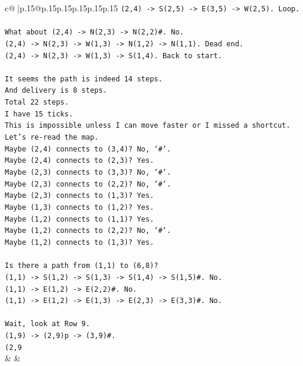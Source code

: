 \documentclass{article}
\begin{document}
{\begin{supertabular}{c@{$\;$}|p{.15\linewidth}@{}p{.15\linewidth}p{.15\linewidth}p{.15\linewidth}p{.15\linewidth}p{.15\linewidth}}
{{{\texttt{(2,4) {-}> S(2,5) {-}> E(3,5) {-}> W(2,5). Loop.} \\
\\ 
\texttt{What about (2,4) {-}> N(2,3) {-}> N(2,2)\#. No.} \\
\texttt{(2,4) {-}> N(2,3) {-}> W(1,3) {-}> N(1,2) {-}> N(1,1). Dead end.} \\
\texttt{(2,4) {-}> N(2,3) {-}> W(1,3) {-}> S(1,4). Back to start.} \\
\\ 
\texttt{It seems the path is indeed 14 steps.} \\
\texttt{And delivery is 8 steps.} \\
\texttt{Total 22 steps.} \\
\texttt{I have 15 ticks.} \\
\texttt{This is impossible unless I can move faster or I missed a shortcut.} \\
\texttt{Let's re{-}read the map.} \\
\texttt{Maybe (2,4) connects to (3,4)? No, `\#`.} \\
\texttt{Maybe (2,4) connects to (2,3)? Yes.} \\
\texttt{Maybe (2,3) connects to (3,3)? No, `\#`.} \\
\texttt{Maybe (2,3) connects to (2,2)? No, `\#`.} \\
\texttt{Maybe (2,3) connects to (1,3)? Yes.} \\
\texttt{Maybe (1,3) connects to (1,2)? Yes.} \\
\texttt{Maybe (1,2) connects to (1,1)? Yes.} \\
\texttt{Maybe (1,2) connects to (2,2)? No, `\#`.} \\
\texttt{Maybe (1,2) connects to (1,3)? Yes.} \\
\\ 
\texttt{Is there a path from (1,1) to (6,8)?} \\
\texttt{(1,1) {-}> S(1,2) {-}> S(1,3) {-}> S(1,4) {-}> S(1,5)\#. No.} \\
\texttt{(1,1) {-}> E(1,2) {-}> E(2,2)\#. No.} \\
\texttt{(1,1) {-}> E(1,2) {-}> E(1,3) {-}> E(2,3) {-}> E(3,3)\#. No.} \\
\\ 
\texttt{Wait, look at Row 9.} \\
\texttt{(1,9) {-}> (2,9)p {-}> (3,9)\#.} \\
\texttt{(2,9} \\
            }
        }
    }
    & & \\ \\


\end{supertabular}}
\end{document}
